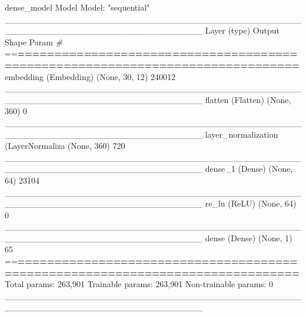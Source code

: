 \documentclass[
]{article}
\newenvironment{Shaded}{}{}
\newcommand{\CommentTok}[1]{\textcolor[rgb]{0.38,0.63,0.69}{\textit{#1}}}
\newcommand{\DecValTok}[1]{\textcolor[rgb]{0.25,0.63,0.44}{#1}}
\newcommand{\ErrorTok}[1]{\textcolor[rgb]{1.00,0.00,0.00}{\textbf{#1}}}
\newcommand{\FunctionTok}[1]{\textcolor[rgb]{0.02,0.16,0.49}{#1}}
\newcommand{\NormalTok}[1]{#1}
\newcommand{\SpecialCharTok}[1]{\textcolor[rgb]{0.25,0.44,0.63}{#1}}
\newcommand{\StringTok}[1]{\textcolor[rgb]{0.25,0.44,0.63}{#1}}
\begin{document}
\begin{Shaded}
\begin{Highlighting}[]
\NormalTok{dense\_model}
\NormalTok{Model}
\NormalTok{Model}\SpecialCharTok{:} \StringTok{"sequential"}
\NormalTok{\_\_\_\_\_\_\_\_\_\_\_\_\_\_\_\_\_\_\_\_\_\_\_\_\_\_\_\_\_\_\_\_\_\_\_\_\_\_\_\_\_\_\_\_\_\_\_\_\_\_\_\_\_\_\_\_\_\_\_\_\_\_\_\_\_\_\_\_\_\_\_\_\_\_\_\_\_\_\_\_}
\FunctionTok{Layer}\NormalTok{ (type)                        Output Shape                    Param }\CommentTok{\#     }
\SpecialCharTok{==}\ErrorTok{==============================================================================}
\FunctionTok{embedding}\NormalTok{ (Embedding)               (None, }\DecValTok{30}\NormalTok{, }\DecValTok{12}\NormalTok{)                  }\DecValTok{240012}      
\NormalTok{\_\_\_\_\_\_\_\_\_\_\_\_\_\_\_\_\_\_\_\_\_\_\_\_\_\_\_\_\_\_\_\_\_\_\_\_\_\_\_\_\_\_\_\_\_\_\_\_\_\_\_\_\_\_\_\_\_\_\_\_\_\_\_\_\_\_\_\_\_\_\_\_\_\_\_\_\_\_\_\_}
\FunctionTok{flatten}\NormalTok{ (Flatten)                   (None, }\DecValTok{360}\NormalTok{)                     }\DecValTok{0}           
\NormalTok{\_\_\_\_\_\_\_\_\_\_\_\_\_\_\_\_\_\_\_\_\_\_\_\_\_\_\_\_\_\_\_\_\_\_\_\_\_\_\_\_\_\_\_\_\_\_\_\_\_\_\_\_\_\_\_\_\_\_\_\_\_\_\_\_\_\_\_\_\_\_\_\_\_\_\_\_\_\_\_\_}
\FunctionTok{layer\_normalization}\NormalTok{ (}\FunctionTok{LayerNormaliza}\NormalTok{ (None, }\DecValTok{360}\NormalTok{)                     }\DecValTok{720}         
\NormalTok{\_\_\_\_\_\_\_\_\_\_\_\_\_\_\_\_\_\_\_\_\_\_\_\_\_\_\_\_\_\_\_\_\_\_\_\_\_\_\_\_\_\_\_\_\_\_\_\_\_\_\_\_\_\_\_\_\_\_\_\_\_\_\_\_\_\_\_\_\_\_\_\_\_\_\_\_\_\_\_\_}
\FunctionTok{dense\_1}\NormalTok{ (Dense)                     (None, }\DecValTok{64}\NormalTok{)                      }\DecValTok{23104}       
\NormalTok{\_\_\_\_\_\_\_\_\_\_\_\_\_\_\_\_\_\_\_\_\_\_\_\_\_\_\_\_\_\_\_\_\_\_\_\_\_\_\_\_\_\_\_\_\_\_\_\_\_\_\_\_\_\_\_\_\_\_\_\_\_\_\_\_\_\_\_\_\_\_\_\_\_\_\_\_\_\_\_\_}
\FunctionTok{re\_lu}\NormalTok{ (ReLU)                        (None, }\DecValTok{64}\NormalTok{)                      }\DecValTok{0}           
\NormalTok{\_\_\_\_\_\_\_\_\_\_\_\_\_\_\_\_\_\_\_\_\_\_\_\_\_\_\_\_\_\_\_\_\_\_\_\_\_\_\_\_\_\_\_\_\_\_\_\_\_\_\_\_\_\_\_\_\_\_\_\_\_\_\_\_\_\_\_\_\_\_\_\_\_\_\_\_\_\_\_\_}
\FunctionTok{dense}\NormalTok{ (Dense)                       (None, }\DecValTok{1}\NormalTok{)                       }\DecValTok{65}          
\SpecialCharTok{==}\ErrorTok{==============================================================================}
\NormalTok{Total params}\SpecialCharTok{:} \DecValTok{263}\NormalTok{,}\DecValTok{901}
\NormalTok{Trainable params}\SpecialCharTok{:} \DecValTok{263}\NormalTok{,}\DecValTok{901}
\NormalTok{Non}\SpecialCharTok{{-}}\NormalTok{trainable params}\SpecialCharTok{:} \DecValTok{0}
\NormalTok{\_\_\_\_\_\_\_\_\_\_\_\_\_\_\_\_\_\_\_\_\_\_\_\_\_\_\_\_\_\_\_\_\_\_\_\_\_\_\_\_\_\_\_\_\_\_\_\_\_\_\_\_\_\_\_\_\_\_\_\_\_\_\_\_\_\_\_\_\_\_\_\_\_\_\_\_\_\_\_\_}
\end{Highlighting}
\end{Shaded}
\end{document}
